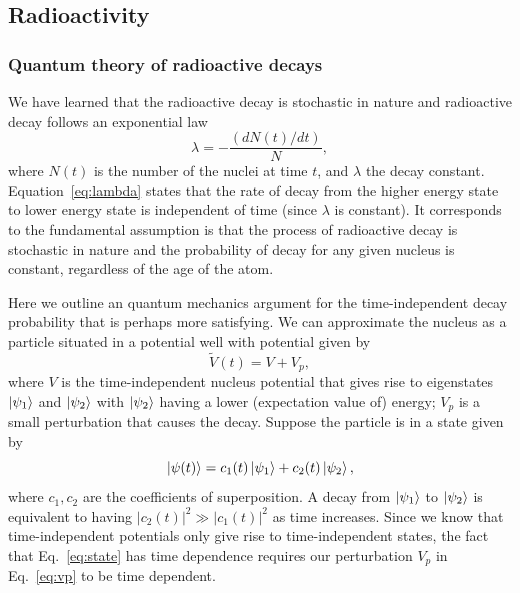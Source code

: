 \documentclass[nofootinbib,preprint,aip,pra]{revtex4-1}
\begin{document}
    \subsection{Radioactivity}
        \subsubsection{Quantum theory of radioactive decays}
        We have learned that the radioactive decay is stochastic in nature and radioactive decay follows
        an exponential law
        \begin{equation}
            \label{eq:lambda}
            \lambda = -\frac{(dN(t)/dt)}{N},
        \end{equation}
        where $N(t)$ is the number of the nuclei at time $t$, and $\lambda$ the decay constant.
        Equation~\ref{eq:lambda} states that the rate of decay from the higher energy state to
        lower energy state is independent of time (since $\lambda$ is constant).
        It corresponds to the fundamental assumption is that the process of radioactive decay is stochastic
        in nature and the probability of decay for any given nucleus is constant,
        regardless of the age of the atom. 
        
        Here we outline an quantum mechanics argument for the time-independent decay probability that is perhaps more
        satisfying.
        We can approximate the nucleus as a particle situated in a potential well with potential given by
        \begin{equation}
            \label{eq:vp}
            \tilde{V}(t) = V + V_p,
        \end{equation}
        where $V$ is the time-independent nucleus potential that gives rise to eigenstates $\ket{\psi_1}$
        and $\ket{\psi_2}$ with $\ket{\psi_2}$ having a lower (expectation value of) energy; $V_p$ is a small
        perturbation that causes the decay.
        Suppose the particle is in a state given by
        \begin{equation}
            \label{eq:state}
            \ket{\psi(t)} = c_1(t)\ket{\psi_1} + c_2(t)\ket{\psi_2},
        \end{equation}
        where $c_1,c_2$ are the coefficients of superposition.
        A decay from $\ket{\psi_1}$ to $\ket{\psi_2}$ is equivalent to
        having $|c_2(t)|^2\gg |c_1(t)|^2$ as time increases. Since we know that time-independent potentials
        only give rise to time-independent states, the fact that Eq.~\ref{eq:state} has time dependence requires
        our perturbation $V_p$ in Eq.~\ref{eq:vp} to be time dependent.
        
\end{document}
